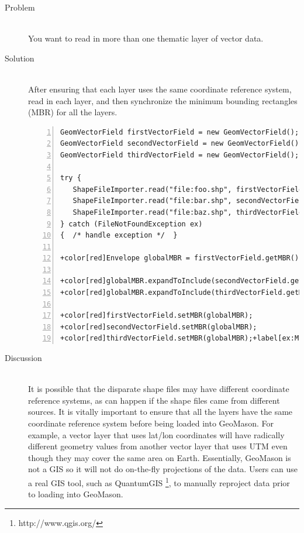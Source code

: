 \documentclass[twoside,10pt]{book}
\begin{document}
\begin{description}
\item[Problem]~\\
You want to read in more than one thematic layer of vector
data.

\item[Solution]~\\
After ensuring that each layer uses the same coordinate reference
system, read in each layer, and then synchronize the minimum bounding
rectangles (MBR) for all the layers.
\begin{Verbatim}[frame=lines,framesep=5mm,numbers=left,commandchars=+\[\]]
GeomVectorField firstVectorField = new GeomVectorField();
GeomVectorField secondVectorField = new GeomVectorField();
GeomVectorField thirdVectorField = new GeomVectorField();

try {
   ShapeFileImporter.read("file:foo.shp", firstVectorField);
   ShapeFileImporter.read("file:bar.shp", secondVectorField);
   ShapeFileImporter.read("file:baz.shp", thirdVectorField);
} catch (FileNotFoundException ex)
{  /* handle exception */  }

+color[red]Envelope globalMBR = firstVectorField.getMBR();+label[ex:MBRstart]

+color[red]globalMBR.expandToInclude(secondVectorField.getMBR());
+color[red]globalMBR.expandToInclude(thirdVectorField.getMBR());

+color[red]firstVectorField.setMBR(globalMBR);
+color[red]secondVectorField.setMBR(globalMBR);
+color[red]thirdVectorField.setMBR(globalMBR);+label[ex:MBRend]
\end{Verbatim}

\item[Discussion]~\\
It is possible that the disparate shape files may have different
coordinate reference systems, as can happen if the shape files came
from different sources.  It is vitally important to ensure that all
the layers have the same coordinate reference system before being
loaded into GeoMason.  For example, a vector layer that uses lat/lon coordinates
will have radically different geometry values from another vector layer that
uses UTM even though they may cover the same area on Earth.
Essentially, GeoMason is not a GIS so it will not do
on-the-fly projections of the data.  Users can use a real GIS tool,
such as QuantumGIS \footnote{http://www.qgis.org/}, to manually
reproject data prior to loading into GeoMason.


\end{description}
\end{document}
